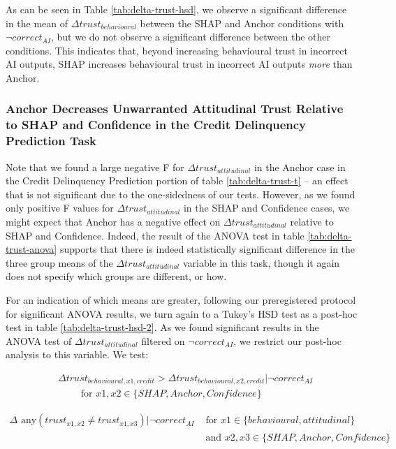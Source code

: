 As can be seen in Table \ref{tab:delta-trust-hsd}, we observe a significant difference in the mean of $\Delta trust_{behavioural}$ between the SHAP and Anchor conditions with $\neg correct_{AI}$, but we do not observe a significant difference between the other conditions. This indicates that, beyond increasing behavioural trust in incorrect AI outputs, SHAP increases behavioural trust in incorrect AI outputs \emph{more} than Anchor.

\subsubsection{Anchor Decreases Unwarranted Attitudinal Trust Relative to SHAP and Confidence in the Credit Delinquency Prediction Task}
Note that we found a large negative F for $\Delta trust_{attitudinal}$ in the Anchor case in the Credit Delinquency Prediction portion of table \ref{tab:delta-trust-t} – an effect that is not significant due to the one-sidedness of our tests. However, as we found only positive F values for $\Delta trust_{attitudinal}$ in the SHAP and Confidence cases, we might expect that Anchor has a negative effect on $\Delta trust_{attitudinal}$ relative to SHAP and Confidence. Indeed, the result of the ANOVA test in table \ref{tab:delta-trust-anova} supports that there is indeed statistically significant difference in the three group means of the $\Delta trust_{attitudinal}$ variable in this task, though it again does not specify which groups are different, or how.

For an indication of which means are greater, following our preregistered protocol for significant ANOVA results, we turn again to a Tukey's HSD test as a post-hoc test in table \ref{tab:delta-trust-hsd-2}. As we found significant results in the ANOVA test of $\Delta trust_{attitudinal}$ filtered on $\neg correct_{AI}$, we restrict our post-hoc analysis to this variable. We test:

\begin{equation}
    \begin{split}
        & \Delta trust_{behavioural,x1,credit} > \Delta trust_{behavioural,x2,credit} | \neg correct_{AI} \\
        & \qquad \text{ for } x1,x2 \in \{SHAP, Anchor, Confidence\}
    \end{split}
\end{equation}

\begin{equation}
    \begin{split}
        \Delta \text{ any}(trust_{x1,x2} \neq trust_{x1,x3}) | \neg correct_{AI} & \text{ for } x1 \in \{behavioural, attitudinal\} \\
        & \text{ and } x2,x3 \in \{SHAP, Anchor, Confidence\}
    \end{split}
\end{equation}

